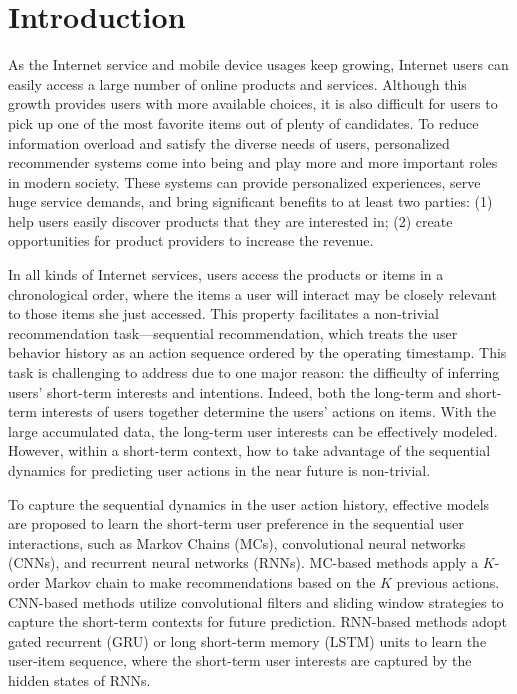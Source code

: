 \documentclass[sigconf]{acmart}
\begin{document}


\maketitle

\section{Introduction}
As the Internet service and mobile device usages keep growing, Internet users can easily access a large number of online products and services. Although this growth provides users with more available choices, it is also difficult for users to pick up one of the most favorite items out of plenty of candidates. To reduce information overload and satisfy the diverse needs of users, personalized recommender systems come into being and play more and more important roles in modern society. These systems can provide personalized experiences, serve huge service demands, and bring significant benefits to at least two parties: (1) help users easily discover products that they are interested in; (2) create opportunities for product providers to increase the revenue.

In all kinds of Internet services, users access the products or items in a chronological order, where the items a user will interact may be closely relevant to those items she just accessed. This property facilitates a non-trivial recommendation task---sequential recommendation, which treats the user behavior history as an action sequence ordered by the operating timestamp. This task is challenging to address due to one major reason: the difficulty of inferring users' short-term interests and intentions. Indeed, both the long-term and short-term interests of users together determine the users' actions on items. With the large accumulated data, the long-term user interests can be effectively modeled. However, within a short-term context, how to take advantage of the sequential dynamics for predicting user actions in the near future is non-trivial.

To capture the sequential dynamics in the user action history, effective models are proposed to learn the short-term user preference in the sequential user interactions, such as Markov Chains (MCs), convolutional neural networks (CNNs), and recurrent neural networks (RNNs). MC-based methods \cite{DBLP:conf/www/RendleFS10,DBLP:conf/icdm/HeM16} apply a $ K $-order Markov chain to make recommendations based on the $ K $ previous actions. CNN-based methods \cite{DBLP:conf/wsdm/TangW18} utilize convolutional filters and sliding window strategies to capture the short-term contexts for future prediction. RNN-based methods \cite{DBLP:journals/corr/HidasiKBT15,DBLP:conf/recsys/QuadranaKHC17,DBLP:conf/cikm/HidasiK18} adopt gated recurrent (GRU) or long short-term memory (LSTM) units to learn the user-item sequence, where the short-term user interests are captured by the hidden states of RNNs.
\end{document}
